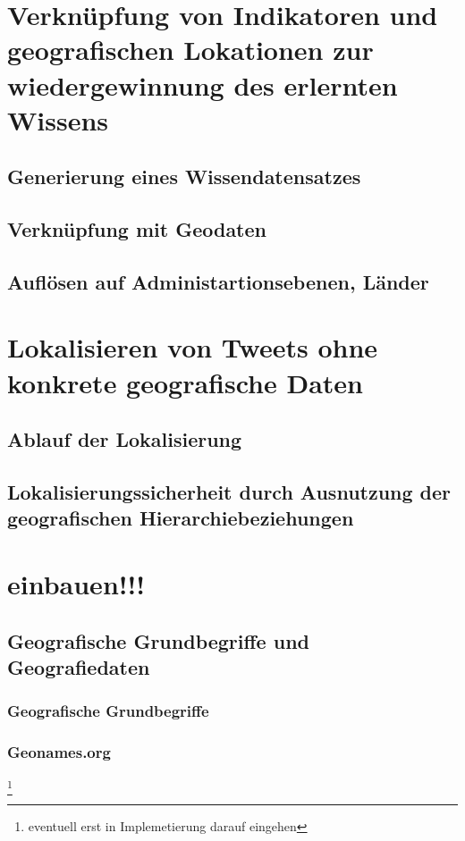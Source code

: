 \section{Verknüpfung von Indikatoren und geografischen Lokationen zur wiedergewinnung des erlernten Wissens}
	
	\subsection{Generierung eines Wissendatensatzes}

	\subsection{Verknüpfung mit Geodaten}

	\subsection{Auflösen auf Administartionsebenen, Länder}

\section{Lokalisieren von Tweets ohne konkrete geografische Daten}
	
	\subsection{Ablauf der Lokalisierung}
	
	\subsection{Lokalisierungssicherheit durch Ausnutzung der geografischen Hierarchiebeziehungen}


\section*{einbauen!!!}
\subsection{Geografische Grundbegriffe und Geografiedaten}

		\subsubsection{Geografische Grundbegriffe}

		\subsubsection{Geonames.org} \footnote{eventuell erst in Implemetierung darauf eingehen} 
			

